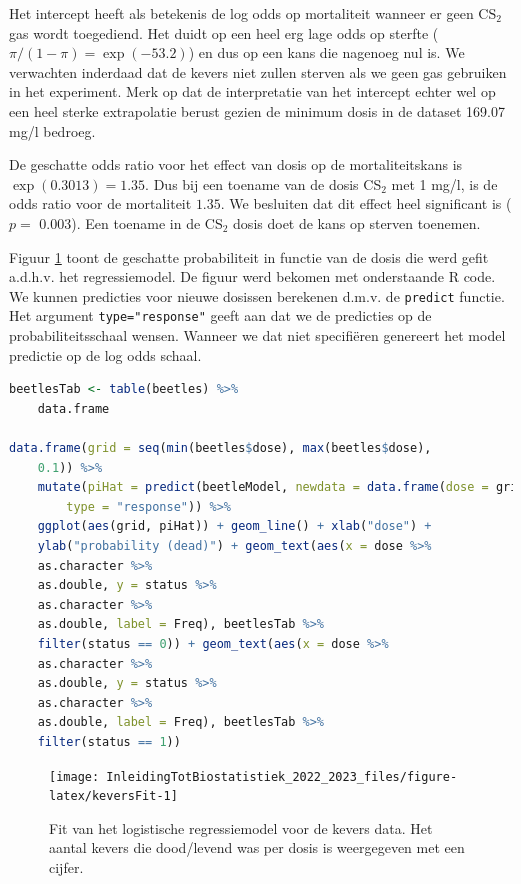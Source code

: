 \documentclass[
  12pt,dutch,coursenotes]{book}
\newcommand{\passthrough}[1]{#1}
\begin{document}
Het intercept heeft als betekenis de log odds op mortaliteit wanneer er geen \(\text{CS}_2\) gas wordt toegediend.
Het duidt op een heel erg lage odds op sterfte (\(\pi/(1-\pi)=\exp(-53.2)\)) en dus op een kans die nagenoeg nul is.
We verwachten inderdaad dat de kevers niet zullen sterven als we geen gas gebruiken in het experiment.
Merk op dat de interpretatie van het intercept echter wel op een heel sterke extrapolatie berust gezien de minimum dosis in de dataset 169.07 mg/l bedroeg.

De geschatte odds ratio voor het effect van dosis op de mortaliteitskans is \(\exp(0.3013)=1.35\). Dus bij een toename van de dosis CS\(_2\) met 1 mg/l, is de odds ratio voor de mortaliteit \(1.35\). We besluiten dat dit effect heel significant is (\(p=\) 0.003). Een toename in de CS\(_2\) dosis doet de kans op sterven toenemen.

Figuur \ref{fig:keversFit} toont de geschatte probabiliteit in functie van de dosis die werd gefit a.d.h.v. het regressiemodel. De figuur werd bekomen met onderstaande R code.
We kunnen predicties voor nieuwe dosissen berekenen d.m.v. de \passthrough{\lstinline!predict!} functie.
Het argument \passthrough{\lstinline!type="response"!} geeft aan dat we de predicties op de probabiliteitsschaal wensen.
Wanneer we dat niet specifiëren genereert het model predictie op de log odds schaal.

\begin{lstlisting}[language=R]
beetlesTab <- table(beetles) %>%
    data.frame

data.frame(grid = seq(min(beetles$dose), max(beetles$dose),
    0.1)) %>%
    mutate(piHat = predict(beetleModel, newdata = data.frame(dose = grid),
        type = "response")) %>%
    ggplot(aes(grid, piHat)) + geom_line() + xlab("dose") +
    ylab("probability (dead)") + geom_text(aes(x = dose %>%
    as.character %>%
    as.double, y = status %>%
    as.character %>%
    as.double, label = Freq), beetlesTab %>%
    filter(status == 0)) + geom_text(aes(x = dose %>%
    as.character %>%
    as.double, y = status %>%
    as.character %>%
    as.double, label = Freq), beetlesTab %>%
    filter(status == 1))
\end{lstlisting}

\begin{figure}

{\centering \texttt{[image: InleidingTotBiostatistiek\_2022\_2023\_files/figure-latex/keversFit-1]} 

}

\caption{Fit van het logistische regressiemodel voor de kevers data. Het aantal kevers die dood/levend was per dosis is weergegeven met een cijfer.}\label{fig:keversFit}
\end{figure}
\end{document}
